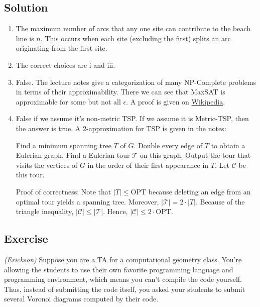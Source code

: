 \documentclass[14pt]{extreport}
\newcounter{counter}
\newcommand{\Exercise}{Exercise \stepcounter{counter}\thecounter}
\begin{document}
\subsection*{Solution}
    \begin{enumerate}
        \item The maximum number of arcs that any one site can contribute to the beach line is $n$. This occurs when each site (excluding the first) splits an arc originating from the first site.
        \item The correct choices are i and iii.
        \item False. The lecture notes give a categorization of many \textsf{NP-Complete} problems in terms of their approximability. There we can see that \textsf{MaxSAT} is approximable for some but not all $\epsilon$. A proof is given on \href{https://en.wikipedia.org/wiki/MAX-3SAT}{Wikipedia}.
        \item False if we assume it's non-metric \textsf{TSP}. If we assume it is \textsf{Metric-TSP}, then the answer is true. A 2-approximation for \textsf{TSP} is given in the notes:

        \vspace{2mm}
        Find a minimum spanning tree $T$ of $G$. Double every edge of $T$ to obtain a Eulerian graph. Find a Eulerian tour $\mathcal{T}$ on this graph. Output the tour that visits the vertices of $G$ in the order of their first appearance in $T$. Let $\mathcal{C}$ be this tour.

        \vspace{2mm}
        Proof of correctness: Note that $|T| \le \text{OPT}$  because deleting an edge from an optimal tour yields a spanning tree. Moreover, $|\mathcal{T}| = 2 \cdot |T|$. Because of the triangle inequality, $|\mathcal{C}| \le |\mathcal{T}|$. Hence, $|\mathcal{C}| \le 2 \cdot \text{OPT}$.
    \end{enumerate}
    
\subsection*{\Exercise}
    \textit{(Erickson)} Suppose you are a TA for a computational geometry class. You’re allowing the students to use their own favorite programming language and programming environment, which means you can’t compile the code yourself. Thus, instead of submitting the code itself, you asked your students to submit several Voronoi diagrams computed by their code.
    
\end{document}

